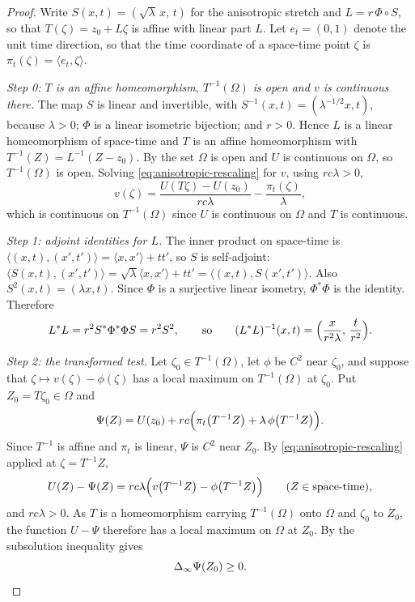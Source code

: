 \begin{proof}
Write $S(x,t)=(\sqrt\lambda\,x,\,t)$ for the anisotropic stretch and
$L=r\,\Phi\circ S$, so that $T(\zeta)=z_0+L\zeta$ is affine with linear part
$L$. Let $e_t=(0,1)$ denote the unit time direction, so that the time
coordinate of a space-time point $\zeta$ is $\pi_t(\zeta)=\langle e_t,\zeta\rangle$.

\emph{Step 0: $T$ is an affine homeomorphism, $T^{-1}(\Omega)$ is open and $v$ is
continuous there.}
The map $S$ is linear and invertible, with
$S^{-1}(x,t)=(\lambda^{-1/2}x,t)$, because $\lambda>0$; $\Phi$ is a linear
isometric bijection; and $r>0$. Hence $L$ is a linear homeomorphism of
space-time and $T$ is an affine homeomorphism with
$T^{-1}(Z)=L^{-1}(Z-z_0)$. By  the set $\Omega$ is open
and $U$ is continuous on $\Omega$, so $T^{-1}(\Omega)$ is open. Solving
\eqref{eq:anisotropic-rescaling} for $v$, using $rc\lambda>0$,
\[
  v(\zeta)=\frac{U(T\zeta)-U(z_0)}{rc\lambda}-\frac{\pi_t(\zeta)}{\lambda},
\]
which is continuous on $T^{-1}(\Omega)$ since $U$ is continuous on $\Omega$ and
$T$ is continuous.

\emph{Step 1: adjoint identities for $L$.}
The inner product on space-time is
$\langle(x,t),(x',t')\rangle=\langle x,x'\rangle+tt'$, so $S$ is self-adjoint:
$\langle S(x,t),(x',t')\rangle=\sqrt\lambda\langle x,x'\rangle+tt'
 =\langle(x,t),S(x',t')\rangle$. Also $S^2(x,t)=(\lambda x,t)$. Since $\Phi$ is a
surjective linear isometry, $\Phi^*\Phi$ is the identity. Therefore
\begin{equation}\label{eq:re-adjoint}
  L^*L=r^2S^*\Phi^*\Phi S=r^2S^2,
  \qquad\text{so}\qquad
  (L^*L)^{-1}(x,t)=\Bigl(\frac{x}{r^2\lambda},\,\frac{t}{r^2}\Bigr).
\end{equation}

\emph{Step 2: the transformed test.}
Let $\zeta_0\in T^{-1}(\Omega)$, let $\phi$ be $C^2$ near $\zeta_0$, and suppose
that $\zeta\mapsto v(\zeta)-\phi(\zeta)$ has a local maximum on $T^{-1}(\Omega)$
at $\zeta_0$. Put $Z_0=T\zeta_0\in\Omega$ and
\[
  \Psi(Z)=U(z_0)+rc\Bigl(\pi_t\bigl(T^{-1}Z\bigr)
      +\lambda\,\phi\bigl(T^{-1}Z\bigr)\Bigr).
\]
Since $T^{-1}$ is affine and $\pi_t$ is linear, $\Psi$ is $C^2$ near $Z_0$.
By \eqref{eq:anisotropic-rescaling} applied at $\zeta=T^{-1}Z$,
\[
  U(Z)-\Psi(Z)=rc\lambda\Bigl(v\bigl(T^{-1}Z\bigr)-\phi\bigl(T^{-1}Z\bigr)\Bigr)
  \qquad(Z\in\text{space-time}),
\]
and $rc\lambda>0$. As $T$ is a homeomorphism carrying $T^{-1}(\Omega)$ onto
$\Omega$ and $\zeta_0$ to $Z_0$, the function $U-\Psi$ therefore has a local
maximum on $\Omega$ at $Z_0$. By  the subsolution
inequality gives
\begin{equation}\label{eq:re-visc}
  \Delta_{\infty}\Psi(Z_0)\ge0 .
\end{equation}


\end{proof}
